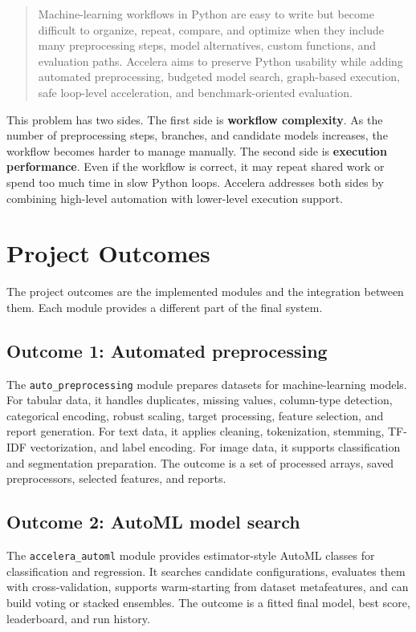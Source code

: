 \documentclass[12pt,a4paper]{report}
\begin{document}
\begin{quote}
Machine-learning workflows in Python are easy to write but become difficult to
organize, repeat, compare, and optimize when they include many preprocessing
steps, model alternatives, custom functions, and evaluation paths. Accelera aims
to preserve Python usability while adding automated preprocessing, budgeted
model search, graph-based execution, safe loop-level acceleration, and
benchmark-oriented evaluation.
\end{quote}

\medskip
\noindent This problem has two sides. The first side is \textbf{workflow complexity}. As
the number of preprocessing steps, branches, and candidate models increases, the
workflow becomes harder to manage manually. The second side is
\textbf{execution performance}. Even if the workflow is correct, it may repeat
shared work or spend too much time in slow Python loops. Accelera addresses both
sides by combining high-level automation with lower-level execution support.

\section{Project Outcomes}

The project outcomes are the implemented modules and the integration between
them. Each module provides a different part of the final system.

\subsection*{Outcome 1: Automated preprocessing}

The \texttt{auto\_preprocessing} module prepares datasets for machine-learning
models. For tabular data, it handles duplicates, missing values, column-type
detection, categorical encoding, robust scaling, target processing, feature
selection, and report generation. For text data, it applies cleaning,
tokenization, stemming, TF-IDF vectorization, and label encoding. For image
data, it supports classification and segmentation preparation. The outcome is a
set of processed arrays, saved preprocessors, selected features, and reports.

\subsection*{Outcome 2: AutoML model search}

The \texttt{accelera\_automl} module provides estimator-style AutoML classes for
classification and regression. It searches candidate configurations, evaluates
them with cross-validation, supports warm-starting from dataset metafeatures,
and can build voting or stacked ensembles. The outcome is a fitted final model,
best score, leaderboard, and run history.
\end{document}
